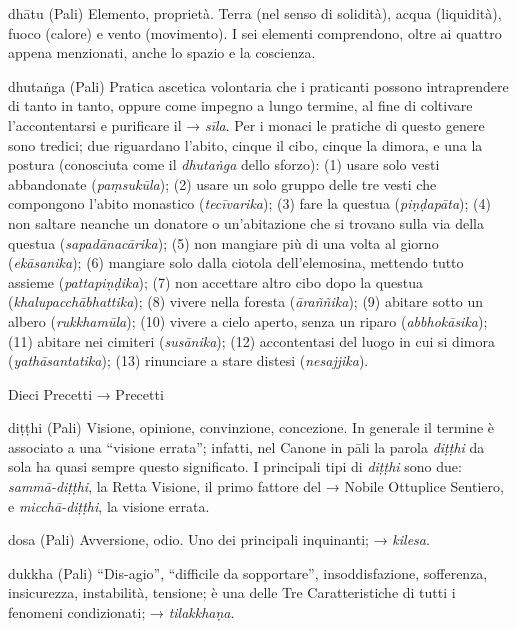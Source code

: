 \begin{glossarydescription}
\item[dhātu] (Pali) Elemento, proprietà. Terra (nel senso di solidità), acqua
(liquidità), fuoco (calore) e vento (movimento). I sei elementi
comprendono, oltre ai quattro appena menzionati, anche lo spazio e la
coscienza.

\item[dhutaṅga] (Pali) Pratica ascetica volontaria che i praticanti possono
intraprendere di tanto in tanto, oppure come impegno a lungo termine, al
fine di coltivare l'accontentarsi e purificare il → \emph{sīla}. Per i
monaci le pratiche di questo genere sono tredici; due riguardano
l'abito, cinque il cibo, cinque la dimora, e una la postura (conosciuta
come il \emph{dhutaṅga} dello sforzo): (1) usare solo vesti abbandonate
(\emph{paṃsukūla}); (2) usare un solo gruppo delle tre vesti
che compongono l'abito monastico (\emph{tecīvarika}); (3) fare la
questua (\emph{piṇḍapāta}); (4) non saltare neanche un donatore
o un'abitazione che si trovano sulla via della questua
(\emph{sapadānacārika}); (5) non mangiare più di una volta al giorno
(\emph{ekāsanika}); (6) mangiare solo dalla ciotola dell'elemosina,
mettendo tutto assieme (\emph{pattapiṇḍika}); (7) non accettare altro
cibo dopo la questua (\emph{khalupacchābhattika}); (8) vivere nella
foresta (\emph{āraññika}); (9) abitare sotto un albero
(\emph{rukkhamūla}); (10) vivere a cielo aperto, senza un riparo
(\emph{abbhokāsika}); (11) abitare nei cimiteri (\emph{susānika}); (12)
accontentasi del luogo in cui si dimora (\emph{yathāsantatika}); (13)
rinunciare a stare distesi (\emph{nesajjika}).

\item[Dieci Precetti] → Precetti

\item[diṭṭhi] (Pali) Visione, opinione, convinzione, concezione. In generale
il termine è associato a una ``visione errata''; infatti, nel Canone in
pāli la parola \emph{diṭṭhi} da sola ha quasi sempre questo significato.
I principali tipi di \emph{diṭṭhi} sono due: \emph{sammā-diṭṭhi}, la
Retta Visione, il primo fattore del → Nobile Ottuplice Sentiero, e
\emph{micchā-diṭṭhi}, la visione errata.

\item[dosa] (Pali) Avversione, odio. Uno dei principali inquinanti; →
\emph{kilesa}.

\item[dukkha] (Pali) ``Dis-agio'', ``difficile da sopportare'',
insoddisfazione, sofferenza, insicurezza, instabilità, tensione; è una
delle Tre Caratteristiche di tutti i fenomeni condizionati; →
\emph{tilakkhaṇa}.


\end{glossarydescription}
